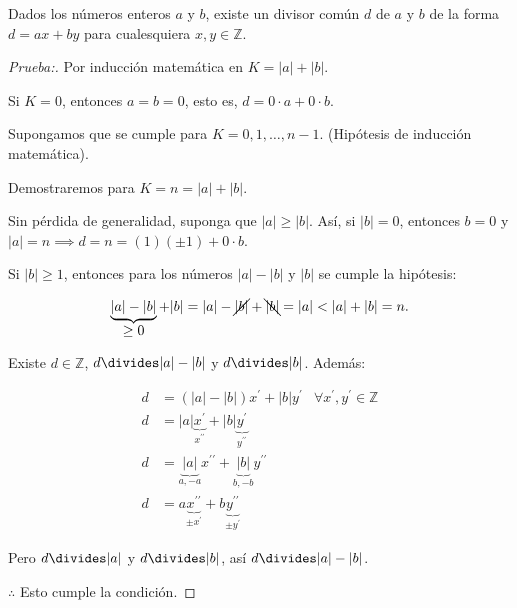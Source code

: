 \documentclass[oneside,a5paper]{memoir}
\begin{document}
\begin{theorem}\label{teo:1.1}

Dados los números enteros $a$ y $b$, existe un divisor común $d$ de $a$ y $b$ de la forma $d=ax+by$ para cualesquiera $x,y\in\mathbb{Z}$.

\begin{proof}[Prueba:]
Por inducción matemática en $K=|a|+|b|$.
 
Si $K=0$, entonces $a=b=0$, esto es, $d=0\cdot a+0\cdot b$. \checkmark
	 
\noindent
Supongamos que se cumple para $K=0,1,\ldots,n-1$. (Hipótesis de inducción matemática).
	 
Demostraremos para $\boxed{K=n=|a|+|b|}$.
	 
\noindent
Sin pérdida de generalidad, suponga que $|a|\geq|b|$. Así, si $|b|=0$, entonces $b=0$ y $|a|=n\implies d=n=(1)(\pm1)+0\cdot b$.
	 
Si $|b|\geq1$, entonces para los números $|a|-|b|$ y $|b|$ se cumple la hipótesis:

\[\underbrace{|a|-|b|}_{\displaystyle\geq0}+|b|=|a|-\cancel{|b|}+\bcancel{|b|}=|a|<|a|+|b|=n.\]

Existe $d\in\mathbb{Z}$, $d\divides |a|-|b|$ y $d\divides |b|$. Además:

\begin{align*}
	d&=\left(|a|-|b|\right)x^{\prime}+|b|y^{\prime}&\forall x^{\prime},y^{\prime}\in\mathbb{Z}\\
	d&=|a|\underbrace{x^{\prime}}_{\displaystyle x^{\prime\prime}}+|b|\underbrace{y^{\prime}}_{\displaystyle y^{\prime\prime}}&\\
	d&=\underbrace{|a|}_{a,-a}x^{\prime\prime}+\underbrace{|b|}_{b,-b}y^{\prime\prime}&\\
	d&=a\underbrace{x^{\prime\prime}}_{\pm x^{\prime}}+b\underbrace{y^{\prime\prime}}_{\pm y^{\prime}}&
\end{align*}

\noindent
Pero $d\divides |a|$ y $d\divides |b|$, así $d\divides |a|-|b|$.

\noindent
$\therefore$ Esto cumple la condición.
\end{proof}

\end{theorem}
\end{document}
